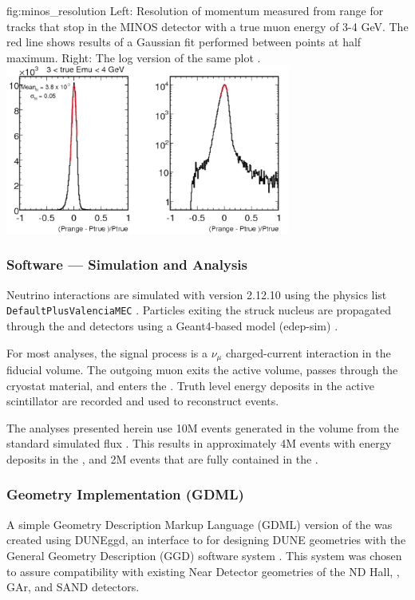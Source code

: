 \begin{dunefigure}{fig:minos_resolution}
{Left: Resolution of momentum measured from range for tracks that stop in the MINOS detector with a true muon energy of 3-4 GeV. The red line shows results of a Gaussian fit performed
between points at half maximum. Right: The log version of the same plot \cite{bhattacharyaMINOS}.
}
\includegraphics[width=0.7\textwidth]{graphics/tms/Minos/MINOS Resolution.png}
\end{dunefigure}

\subsubsection{Software --- Simulation and Analysis}

Neutrino interactions are simulated with  version 2.12.10 using the physics list \texttt{DefaultPlusValenciaMEC} \cite{Andreopoulos:2009rq}. Particles exiting the struck nucleus are propagated through the  and  detectors using a Geant4-based model (edep-sim) \cite{edepsim}.


For most analyses, the signal process is a $\nu_{\mu}$ charged-current interaction in the  fiducial volume. The outgoing muon exits the  active volume, passes through the cryostat material, and enters the . Truth level energy deposits in the active scintillator are recorded and used to reconstruct events. 

The analyses presented herein use 10M events generated in the  volume from the standard simulated   flux . This results in approximately 4M events with energy deposits in the , and 2M events that are fully contained in the . 

\subsubsection{Geometry Implementation (GDML)}
A simple Geometry Description Markup Language (GDML) version of the  was created using DUNEggd, an interface to for designing DUNE geometries with the General Geometry Description (GGD) software system \cite{ref:ggd}. This system was chosen to assure compatibility with existing Near Detector geometries of the ND Hall, , GAr, and SAND detectors. 

